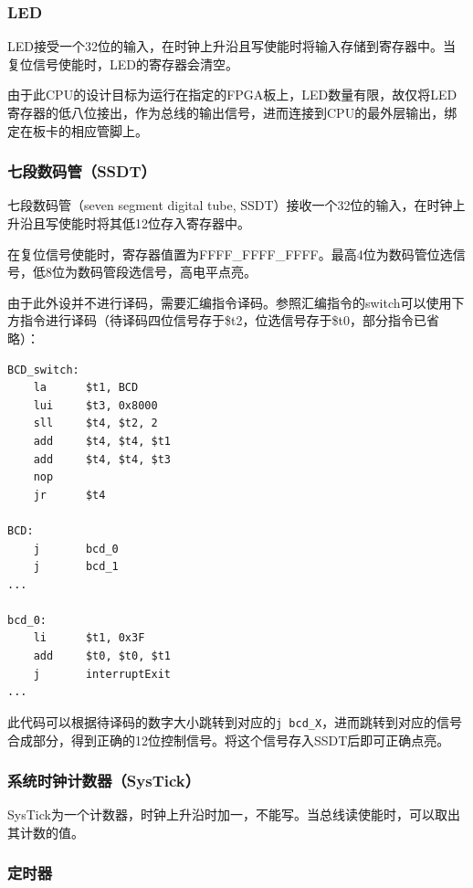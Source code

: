 \documentclass[a4paper]{article}
\begin{document}
\subsubsection{LED}

LED接受一个32位的输入，在时钟上升沿且写使能时将输入存储到寄存器中。当复位信号使能时，LED的寄存器会清空。

由于此CPU的设计目标为运行在指定的FPGA板上，LED数量有限，故仅将LED寄存器的低八位接出，作为总线的输出信号，进而连接到CPU的最外层输出，绑定在板卡的相应管脚上。

\subsubsection{七段数码管（SSDT）}

七段数码管（seven segment digital tube, SSDT）接收一个32位的输入，在时钟上升沿且写使能时将其低12位存入寄存器中。

在复位信号使能时，寄存器值置为FFFF\_FFFF\_FFFF。最高4位为数码管位选信号，低8位为数码管段选信号，高电平点亮。

由于此外设并不进行译码，需要汇编指令译码。参照汇编指令的switch可以使用下方指令进行译码（待译码四位信号存于\$t2，位选信号存于\$t0，部分指令已省略）：

\begin{verbatim}
BCD_switch:
    la      $t1, BCD
    lui     $t3, 0x8000
    sll     $t4, $t2, 2
    add     $t4, $t4, $t1
    add     $t4, $t4, $t3
    nop
    jr      $t4

BCD:
    j       bcd_0
    j       bcd_1
...

bcd_0:
    li      $t1, 0x3F
    add     $t0, $t0, $t1
    j       interruptExit
...
\end{verbatim}

此代码可以根据待译码的数字大小跳转到对应的\texttt{j bcd_X}，进而跳转到对应的信号合成部分，得到正确的12位控制信号。将这个信号存入SSDT后即可正确点亮。

\subsubsection{系统时钟计数器（SysTick）}

SysTick为一个计数器，时钟上升沿时加一，不能写。当总线读使能时，可以取出其计数的值。

\subsubsection{定时器}
\end{document}
